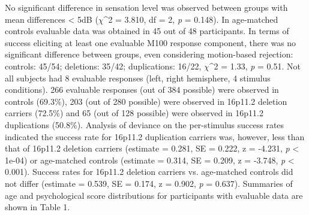 \documentclass{article}
\begin{document}
No significant difference in sensation level was observed between groups  with mean differences < 5dB ($\chi$^2 = 3.810, df = 2, \emph{p} = 0.148).  In age-matched controls evaluable data was obtained in 45 out of 48 participants. In terms of success eliciting at least one evaluable M100 response component, there was no significant difference between groups, even considering motion-based rejection: controls: 45/54; deletions: 35/42; duplications: 16/22, $\chi$^2 = 1.33, \emph{p} = 0.51. Not all subjects had 8 evaluable responses (left, right hemisphere, 4 stimulus conditions). 266 evaluable responses (out of 384 possible) were observed in controls (69.3\%), 203 (out of 280 possible) were observed in 16p11.2 deletion carriers (72.5\%) and 65 (out of 128 possible) were observed in 16p11.2 duplications (50.8\%). Analysis of deviance on the per-stimulus success rates indicated the success rate for 16p11.2 duplication carriers was, however, less than that of 16p11.2 deletion carriers (estimate = 0.281, SE = 0.222, z = -4.231, \emph{p} <  1e-04) or age-matched controls (estimate = 0.314, SE = 0.209, z = -3.748, \emph{p} < 0.001). Success rates for 16p11.2 deletion carriers vs. age-matched controls did not differ (estimate = 0.539, SE = 0.174, z = 0.902, \emph{p} = 0.637). Summaries of age and psychological score distributions for participants with evaluable data are shown in Table 1. 
\end{document}
